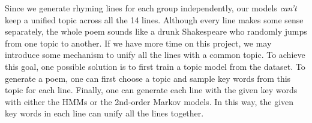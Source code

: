 Since we generate rhyming lines for each group independently, our models \textit{can't} keep a unified topic across all the 14 lines. Although every line makes some sense separately, the whole poem sounds like a drunk Shakespeare who randomly jumps from one topic to another. If we have more time on this project, we may introduce some mechanism to unify all the lines with a common topic. To achieve this goal, one possible solution is to first train a topic model from the dataset. To generate a poem, one can first choose a topic and sample key words from this topic for each line. Finally, one can generate each line with the given key words with either the HMMs or the 2nd-order Markov models. In this way, the given key words in each line can unify all the lines together. 